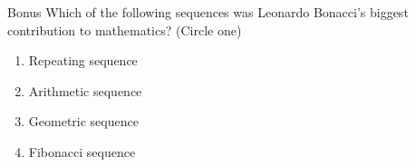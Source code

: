 \documentclass[12pt,letterpaper]{article}
\begin{document}
\begin{problem}{Bonus}
 Which of the following sequences was Leonardo Bonacci's biggest contribution to
 mathematics? (Circle one)

 \begin{enumerate}[\hspace{1em}a)]
  \item Repeating sequence
  \item Arithmetic sequence
  \item Geometric sequence
  \item Fibonacci sequence
 \end{enumerate}
\end{problem}
\end{document}
